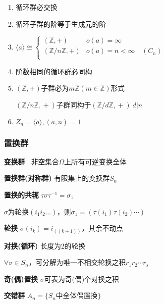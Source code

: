 \documentclass[b4paper, 10pt]{ctexart}
\newcommand*{\setZ}{\mathbb{Z}}
\newcommand*{\gengroup}[1]{\langle #1 \rangle}
\begin{document}
\begin{multicols}{3}
    \begin{theorem}[循环群性质]
        \hfil

        \begin{enumerate}
            \item 循环群必交换
            \item 循环子群的阶等于生成元的阶
            \item $\gengroup{a} \cong \begin{cases}
                          (\setZ, +)        & o(a)=\infty                   \\
                          (\setZ/n\setZ, +) & o(a) = n < \infty \quad (C_n) \\
                      \end{cases}$
            \item 阶数相同的循环群必同构
            \item $(\setZ, +)\!$子群必为$m\setZ(m \!\in\! \setZ)$形式

                  $(\setZ/n\setZ,\! +)\!$子群同构于$\!(\setZ/d\setZ,\! +)\  d|n$
            \item $Z_n=\gengroup{\bar{a}}, (a,n)=1$
        \end{enumerate}
    \end{theorem}

    \subsubsection{置换群}

    \textbf{变换群\ } 非空集合$\Omega$上所有可逆变换全体

    \textbf{置换群(对称群)} 有限集上的变换群$S_n$

    \textbf{置换的共轭} $\tau \sigma \tau^{-1} = \sigma_1$

    $\sigma$为轮换$(i_1 i_2 ...)$，则$\sigma_1 = (\tau(i_1) \tau(i_2) \cdots)$

    \textbf{轮换} $\sigma(i_k) = i_{((k+1))}$，其余不动点

    \textbf{对换(循环)} 长度为2的轮换

    \begin{theorem}[标准轮换分解]
        $\forall \sigma \in S_n$，可分解为唯一不相交轮换之积$r_1 r_2 \cdots r_s$
    \end{theorem}

    \textbf{奇(偶)置换} $\sigma$可表为奇(偶)个对换之积

    \textbf{交错群} $A_n = \{ S_n \text{中全体偶置换} \}$


\end{multicols}
\end{document}
